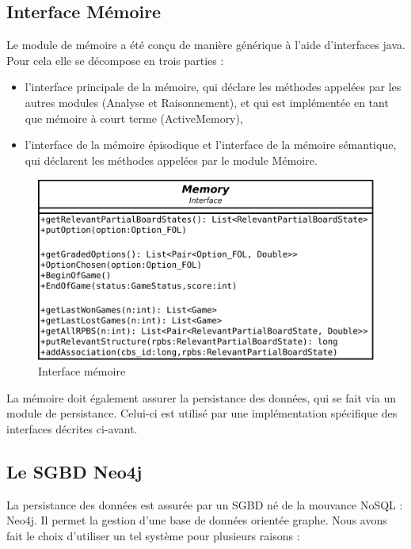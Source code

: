 \subsection{Interface Mémoire}

Le module de mémoire a été conçu de manière générique à l'aide d'interfaces java. Pour cela elle se décompose en trois parties :

\begin{itemize}
\item l'interface principale de la mémoire, qui déclare les méthodes appelées par les autres modules (Analyse et Raisonnement), et qui est implémentée en tant que mémoire à court terme (ActiveMemory),

\item l'interface de la mémoire épisodique et l'interface de la mémoire sémantique, qui déclarent les méthodes appelées par le module Mémoire.
\end{itemize}

\begin{figure}[H]
\includegraphics[width=\textwidth]{files/memoire/interface}
\caption{Interface mémoire}
\end{figure}

La mémoire doit également assurer la persistance des données, qui se fait via un module de persistance. Celui-ci est utilisé par une implémentation spécifique des interfaces décrites ci-avant.

\subsection{Le \gls{SGBD} Neo4j}

La persistance des données est assurée par un SGBD né de la mouvance \gls{NoSQL} : Neo4j. Il permet la gestion d'une base de données orientée graphe. Nous avons fait le choix d'utiliser un tel système pour plusieurs raisons :

